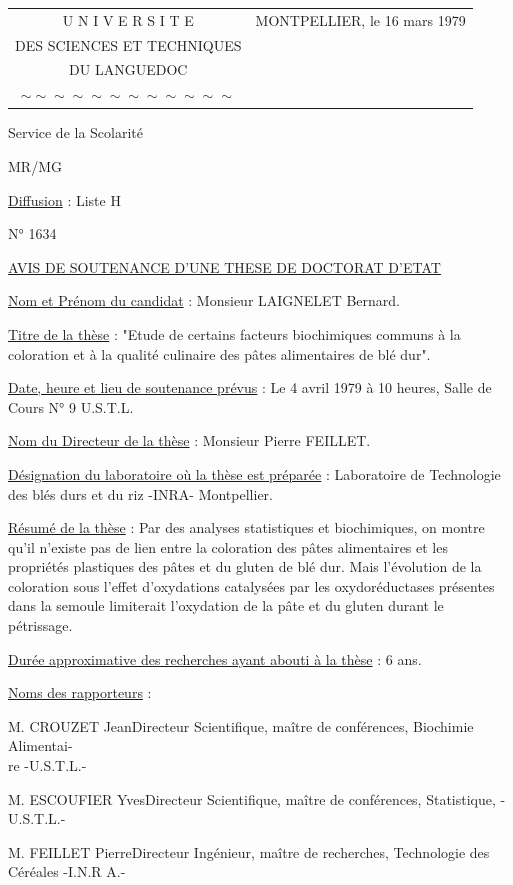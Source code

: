 \begin{tabular}{c@{\qquad}l}
U N I V E R S I T E & MONTPELLIER, le 16 mars 1979\\
DES SCIENCES ET TECHNIQUES &\\
DU LANGUEDOC &\\
$\sim\sim\sim\sim\sim\sim\sim\sim\sim\sim\sim\sim$ &
\end{tabular}

Service de la Scolarité

MR/MG

\uline{Diffusion} : Liste H

N° 1634

\uline{AVIS DE SOUTENANCE D'UNE THESE DE DOCTORAT D'ETAT}

\uline{Nom et Prénom du candidat} : Monsieur LAIGNELET Bernard.

\uline{Titre de la thèse} : "Etude de certains facteurs biochimiques communs à la coloration et à la qualité culinaire des pâtes alimentaires de blé dur".

\uline{Date, heure et lieu de soutenance prévus} : Le 4 avril 1979 à 10 heures, Salle de Cours N° 9 U.S.T.L.

\uline{Nom du Directeur de la thèse} : Monsieur Pierre FEILLET.

\uline{Désignation du laboratoire où la thèse est préparée} : Laboratoire de Technologie des blés durs et du riz -INRA- Montpellier.

\uline{Résumé de la thèse} : Par des analyses statistiques et biochimiques, on montre qu'il n'existe pas de lien entre la coloration des pâtes alimentaires et les propriétés plastiques des pâtes et du gluten de blé dur.
Mais l'évolution de la coloration sous l'effet d'oxydations catalysées par les oxydoréductases présentes dans la semoule limiterait l'oxydation de la pâte et du gluten durant le pétrissage.

\uline{Durée approximative des recherches ayant abouti à la thèse} : 6 ans.

\uline{Noms des rapporteurs} :

M. CROUZET Jean\quad Directeur Scientifique, maître de conférences, Biochimie Alimentai-\\
\hspace*{3cm}re -U.S.T.L.-

M. ESCOUFIER Yves\quad Directeur Scientifique, maître de conférences, Statistique, -U.S.T.L.-

M. FEILLET Pierre\quad Directeur Ingénieur, maître de recherches, Technologie des Céréales -I.N.R A.-

